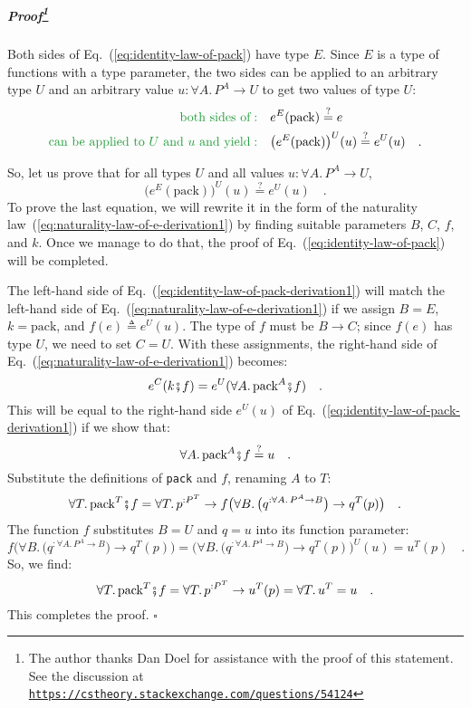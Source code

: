 \subparagraph{Proof\protect\footnote{The author thanks Dan Doel for assistance with the
proof of this statement. See the discussion at \texttt{\protect\href{https://cstheory.stackexchange.com/questions/54124}{https://cstheory.stackexchange.com/questions/54124}}}}

Both sides of Eq.~(\ref{eq:identity-law-of-pack}) have type $E$.
Since $E$ is a type of functions with a type parameter, the two sides
can be applied to an arbitrary type $U$ and an arbitrary value $u:\forall A.\,P^{A}\rightarrow U$
to get two values of type $U$:
\begin{align*}
{\color{greenunder}\text{both sides of}:}\quad & e^{E}(\text{pack})\overset{?}{=}e\\
{\color{greenunder}\text{can be applied to }U\text{ and }u\text{ and yield}:}\quad & \big(e^{E}(\text{pack})\big)^{U}(u)\overset{?}{=}e^{U}(u)\quad.
\end{align*}

So, let us prove that for all types $U$ and all values $u:\forall A.\,P^{A}\rightarrow U$,
\begin{equation}
\big(e^{E}(\text{pack})\big)^{U}(u)\overset{?}{=}e^{U}(u)\quad.\label{eq:identity-law-of-pack-derivation1}
\end{equation}
To prove the last equation, we will rewrite it in the form of the
naturality law~(\ref{eq:naturality-law-of-e-derivation1}) by finding
suitable parameters $B$, $C$, $f$, and $k$. Once we manage to
do that, the proof of Eq.~(\ref{eq:identity-law-of-pack}) will be
completed. 

The left-hand side of Eq.~(\ref{eq:identity-law-of-pack-derivation1})
will match the left-hand side of Eq.~(\ref{eq:naturality-law-of-e-derivation1})
if we assign $B=E$, $k=\text{pack}$, and $f(e)\triangleq e^{U}(u)$.
The type of $f$ must be $B\rightarrow C$; since $f(e)$ has type
$U$, we need to set $C=U$. With these assignments, the right-hand
side of Eq.~(\ref{eq:naturality-law-of-e-derivation1}) becomes:
\[
e^{C}(k\bef f)=e^{U}(\forall A.\,\text{pack}^{A}\bef f)\quad.
\]
This will be equal to the right-hand side $e^{U}(u)$ of Eq.~(\ref{eq:identity-law-of-pack-derivation1})
if we show that:
\[
\forall A.\,\text{pack}^{A}\bef f\overset{?}{=}u\quad.
\]
Substitute the definitions of \lstinline!pack! and $f$, renaming
$A$ to $T$:
\[
\forall T.\,\text{pack}^{T}\bef f=\forall T.\,p^{:P^{T}}\rightarrow f\big(\forall B.\,\big(q^{:\forall A.\,P^{A}\rightarrow B}\big)\rightarrow q^{T}(p)\big)\quad.
\]
The function $f$ substitutes $B=U$ and $q=u$ into its function
parameter:
\[
f\big(\forall B.\,\big(q^{:\forall A.\,P^{A}\rightarrow B}\big)\rightarrow q^{T}(p)\big)=\big(\forall B.\,\big(q^{:\forall A.\,P^{A}\rightarrow B}\big)\rightarrow q^{T}(p)\big)^{U}(u)=u^{T}(p)\quad.
\]
So, we find:
\[
\forall T.\,\text{pack}^{T}\bef f=\forall T.\,p^{:P^{T}}\rightarrow u^{T}(p)=\forall T.\,u^{T}=u\quad.
\]
This completes the proof. $\square$

